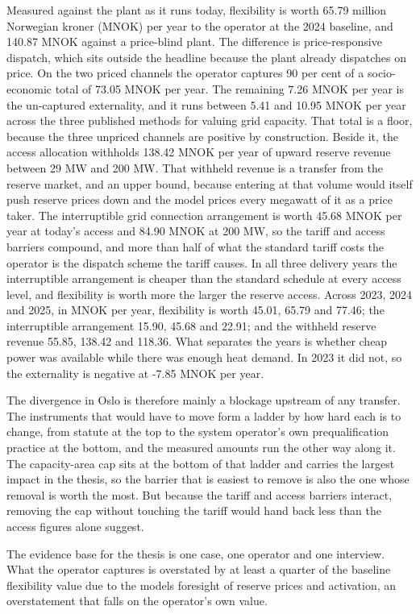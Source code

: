 Measured against the plant as it runs today, flexibility is worth 65.79 million Norwegian kroner (MNOK) per year to the operator at the 2024 baseline, and 140.87 MNOK against a price-blind plant. The difference is price-responsive dispatch, which sits outside the headline because the plant already dispatches on price. On the two priced channels the operator captures 90 per cent of a socio-economic total of 73.05 MNOK per year. The remaining 7.26 MNOK per year is the un-captured externality, and it runs between 5.41 and 10.95 MNOK per year across the three published methods for valuing grid capacity. That total is a floor, because the three unpriced channels are positive by construction. Beside it, the access allocation withholds 138.42 MNOK per year of upward reserve revenue between 29 MW and 200 MW. That withheld revenue is a transfer from the reserve market, and an upper bound, because entering at that volume would itself push reserve prices down and the model prices every megawatt of it as a price taker. The interruptible grid connection arrangement is worth 45.68 MNOK per year at today's access and 84.90 MNOK at 200 MW, so the tariff and access barriers compound, and more than half of what the standard tariff costs the operator is the dispatch scheme the tariff causes. In all three delivery years the interruptible arrangement is cheaper than the standard schedule at every access level, and flexibility is worth more the larger the reserve access. Across 2023, 2024 and 2025, in MNOK per year, flexibility is worth 45.01, 65.79 and 77.46; the interruptible arrangement 15.90, 45.68 and 22.91; and the withheld reserve revenue 55.85, 138.42 and 118.36. What separates the years is whether cheap power was available while there was enough heat demand. In 2023 it did not, so the externality is negative at -7.85 MNOK per year.

The divergence in Oslo is therefore mainly a blockage upstream of any transfer. The instruments that would have to move form a ladder by how hard each is to change, from statute at the top to the system operator's own prequalification practice at the bottom, and the measured amounts run the other way along it. The capacity-area cap sits at the bottom of that ladder and carries the largest impact in the thesis, so the barrier that is easiest to remove is also the one whose removal is worth the most. But because the tariff and access barriers interact, removing the cap without touching the tariff would hand back less than the access figures alone suggest.

The evidence base for the thesis is one case, one operator and one interview. What the operator captures is overstated by at least a quarter of the baseline flexibility value due to the models foresight of reserve prices and activation, an overstatement that falls on the operator's own value. 